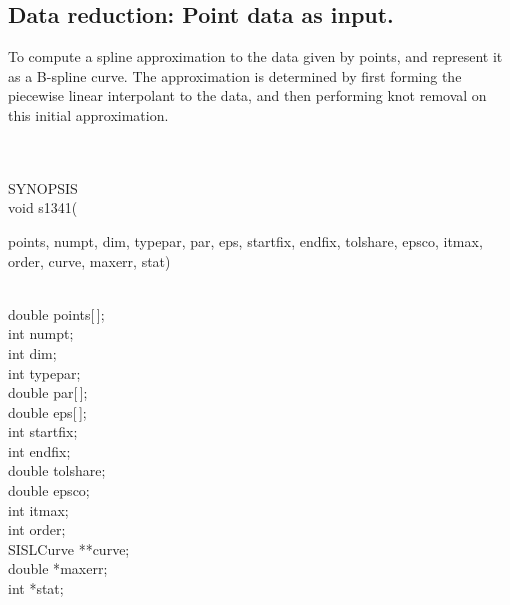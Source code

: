 \subsection{Data reduction: Point data as input.}
\begin{minipg1}
  To compute a spline approximation to the data given by  points, and
  represent it as a B-spline curve. The approximation is determined by
  first forming the piecewise
  linear interpolant to the data, and then performing knot removal on
  this initial approximation.
\end{minipg1} \\ \\
SYNOPSIS\\
        \>void s1341(\begin{minipg3}
        {\fov points}, {\fov numpt}, {\fov dim}, {\fov typepar}, {\fov par}, {\fov eps}, {\fov startfix}, {\fov endfix}, {\fov tolshare}, {\fov epsco},
        {\fov itmax}, {\fov order}, {\fov curve}, {\fov maxerr}, {\fov stat})
                \end{minipg3}\\[0.3ex]
                \>\>    double  \>      {\fov points}[\,];\\
                \>\>    int     \>      {\fov numpt};\\
                \>\>    int     \>      {\fov dim};\\
                \>\>    int     \>      {\fov typepar};\\
                \>\>    double  \>      {\fov par}[\,];\\
                \>\>    double  \>      {\fov eps}[\,];\\
                \>\>    int     \>      {\fov startfix};\\
                \>\>    int     \>      {\fov endfix};\\
                \>\>    double  \>      {\fov tolshare};\\
                \>\>    double  \>      {\fov epsco};\\
                \>\>    int     \>      {\fov itmax};\\
                \>\>    int     \>      {\fov order};\\
                \>\>    SISLCurve       \>      **{\fov curve};\\
                \>\>    double  \>      *{\fov maxerr};\\
                \>\>    int     \>      *{\fov stat};\\
